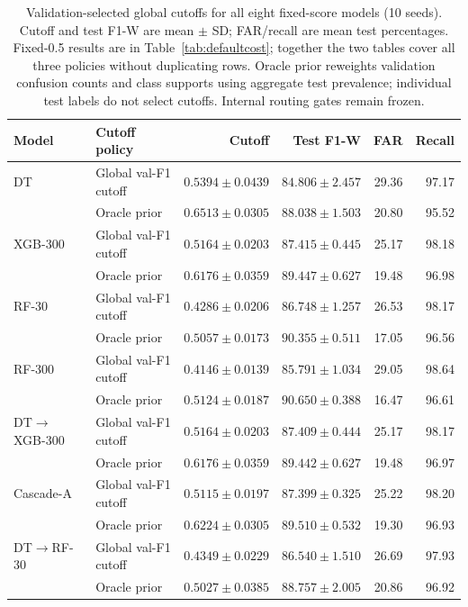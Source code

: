 \begin{table}[!htbp]
\centering
\caption{Validation-selected global cutoffs for all eight fixed-score models (10 seeds). Cutoff and test F1-W are mean $\pm$ SD; FAR/recall are mean test percentages. Fixed-0.5 results are in Table~\ref{tab:defaultcost}; together the two tables cover all three policies without duplicating rows. Oracle prior reweights validation confusion counts and class supports using aggregate test prevalence; individual test labels do not select cutoffs. Internal routing gates remain frozen.}
\label{tab:threshold}
\small
\setlength{\tabcolsep}{4pt}
\begin{tabularx}{\textwidth}{@{}lXrrrr@{}}
\toprule
Model & Cutoff policy & Cutoff & Test F1-W & FAR & Recall \\
\midrule
DT & Global val-F1 cutoff & $0.5394\pm0.0439$ & $84.806\pm2.457$ & 29.36 & 97.17 \\
 & Oracle prior & $0.6513\pm0.0305$ & $88.038\pm1.503$ & 20.80 & 95.52 \\
\addlinespace
XGB-300 & Global val-F1 cutoff & $0.5164\pm0.0203$ & $87.415\pm0.445$ & 25.17 & 98.18 \\
 & Oracle prior & $0.6176\pm0.0359$ & $89.447\pm0.627$ & 19.48 & 96.98 \\
\addlinespace
RF-30 & Global val-F1 cutoff & $0.4286\pm0.0206$ & $86.748\pm1.257$ & 26.53 & 98.17 \\
 & Oracle prior & $0.5057\pm0.0173$ & $90.355\pm0.511$ & 17.05 & 96.56 \\
\addlinespace
RF-300 & Global val-F1 cutoff & $0.4146\pm0.0139$ & $85.791\pm1.034$ & 29.05 & 98.64 \\
 & Oracle prior & $0.5124\pm0.0187$ & $90.650\pm0.388$ & 16.47 & 96.61 \\
\addlinespace
DT$\to$XGB-300 & Global val-F1 cutoff & $0.5164\pm0.0203$ & $87.409\pm0.444$ & 25.17 & 98.17 \\
 & Oracle prior & $0.6176\pm0.0359$ & $89.442\pm0.627$ & 19.48 & 96.97 \\
\addlinespace
Cascade-A & Global val-F1 cutoff & $0.5115\pm0.0197$ & $87.399\pm0.325$ & 25.22 & 98.20 \\
 & Oracle prior & $0.6224\pm0.0305$ & $89.510\pm0.532$ & 19.30 & 96.93 \\
\addlinespace
DT$\to$RF-30 & Global val-F1 cutoff & $0.4349\pm0.0229$ & $86.540\pm1.510$ & 26.69 & 97.93 \\
 & Oracle prior & $0.5027\pm0.0385$ & $88.757\pm2.005$ & 20.86 & 96.92 \\

\end{tabularx}
\end{table}
